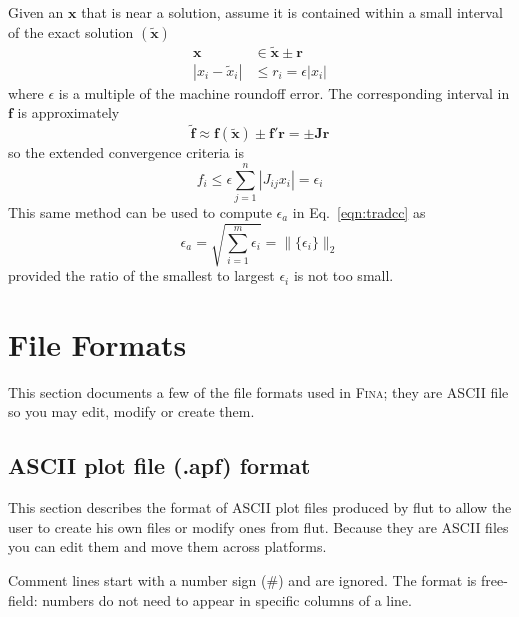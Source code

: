 \documentclass[10pt,openany,twoside]{book}
\numberwithin{equation}{section}   %
\newcommand{\Cmd}[1]{{\sf #1}}
\newcommand{\Fina}{{\normalfont\scshape Fina\:}}
\newcommand{\Matrix}[1]{\boldsymbol{#1}}
\newcommand{\Vector}[1]{\boldsymbol{#1}}
\newcommand{\Eqn}[1]{Eq.\ \ref{#1}}
\begin{document}
Given an $\Vector{x}$ that is near a solution, assume it is contained
within a small interval of the exact
solution $(\Vector{\tilde{x}})$
\begin{align}
\Vector{x} &\in \tilde{\Vector{x}} \pm \Vector{r} \nonumber \\
|x_i - \tilde{x}_i| &\le r_i = \epsilon |x_i|
\end{align}
where $\epsilon$ is a multiple of the machine roundoff error.
The corresponding interval in $\Vector{f}$ is approximately
\begin{equation}
\Vector{\tilde{f}} \approx \Vector{f(\tilde{x})} \pm \Vector{f}' \Vector{r}
	= \pm \Matrix{J}\Vector{r}
\end{equation}
so the extended convergence criteria is
\begin{equation}
f_i \le \epsilon \sum_{j=1}^{n} |J_{ij} x_i| = \epsilon_i
\end{equation}
This same method can be used to compute $\epsilon_a$ in \Eqn{eqn:tradcc} as
\begin{equation}
\epsilon_a = \sqrt{\sum_{i=1}^{m} \epsilon_i} = \|\{\epsilon_i\}\|_2
\end{equation}
provided the ratio of the smallest to largest $\epsilon_i$ is not too small.


\section{File Formats}
This section documents a few of the file formats used in \Fina; they
are ASCII file so you may edit, modify or create them.

\subsection{ASCII plot file (.apf) format}\label{sect:apf-file}
This section describes the format of ASCII plot files produced by
\Cmd{flut} to allow the user to create his own files or modify ones
from \Cmd{flut}.
Because they are ASCII files
you can edit them and move them across platforms.

Comment lines start with a number sign (\#) and
are ignored.
The format is free-field: numbers do not need to
appear in specific columns of a line.
\end{document}
